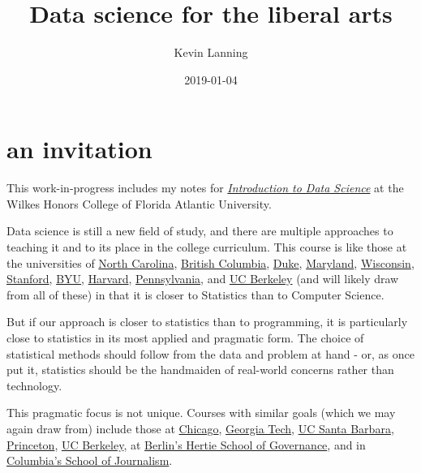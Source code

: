 \documentclass[openany]{book}
\title{Data science for the liberal arts}
\author{Kevin Lanning}
\date{2019-01-04}
\begin{document}
\maketitle

{
\setcounter{tocdepth}{1}
\tableofcontents
}
\hypertarget{section}{%
\chapter*{}\label{section}}

\hypertarget{an-invitation}{%
\chapter*{an invitation}\label{an-invitation}}

This work-in-progress includes my notes for \href{https://kevinlanning.github.io/DataSciSpring2019/}{\emph{\emph{Introduction to Data Science}}} at the Wilkes Honors College of Florida Atlantic University.

Data science is still a new field of study, and there are multiple approaches to teaching it and to its place in the college curriculum. This course is like those at the universities of \href{https://idc9.github.io/stor390/}{North Carolina}, \href{https://github.com/STAT545-UBC/STAT545-UBC.github.io}{British Columbia}, \href{https://www2.stat.duke.edu/courses/Fall15/sta112.01/}{Duke}, \href{http://www.hcbravo.org/IntroDataSci/calendar/}{Maryland}, \href{http://pages.stat.wisc.edu/~yandell/R_for_data_sciences/syllabus.html}{Wisconsin}, \href{https://github.com/dcl-2017-04/curriculum}{Stanford}, \href{https://byuistats.github.io/M335/syllabus.html}{BYU}, \href{http://datasciencelabs.github.io/}{Harvard}, \href{https://github.com/MUSA-620-Spring-2017/Course-Materials}{Pennsylvania}, and \href{https://github.com/FAUDataScience/stat259}{UC Berkeley} (and will likely draw from all of these) in that it is closer to Statistics than to Computer Science.

But if our approach is closer to statistics than to programming, it is particularly close to statistics in its most applied and pragmatic form. The choice of statistical methods should follow from the data and problem at hand - or, as \citet{loevinger1957objective} once put it, statistics should be the handmaiden of real-world concerns rather than technology.

This pragmatic focus is not unique. Courses with similar goals (which we may again draw from) include those at \href{https://github.com/UC-MACSS/persp-analysis}{Chicago}, \href{https://github.com/jacobeisenstein/gt-css-class}{Georgia Tech}, \href{https://github.com/raviolli77/dataScience-UCSBProjectGroup-Syllabus}{UC Santa Barbara}, \href{http://www.princeton.edu/~mjs3/soc596_f2016/}{Princeton}, \href{https://github.com/rochelleterman/PS239T}{UC Berkeley}, at \href{https://github.com/HertieDataScience/SyllabusAndLectures}{Berlin's Hertie School of Governance}, and in \href{https://github.com/tommeagher/data1-fall2015}{Columbia's School of Journalism}.
\end{document}
